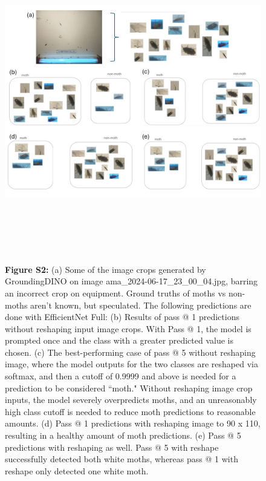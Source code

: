 \documentclass[twocolumn]{article}
\begin{document}
\begin{figure}[h]
    \includegraphics[width=16cm, height=14cm]{imgs/S_fig2.jpg}
    \captionsetup{width=0.9\textwidth}
    \caption*{\textbf{Figure S2:} (a) Some of the image crops generated by GroundingDINO on image 
    ama\_2024-06-17\_23\_00\_04.jpg, barring an incorrect crop on equipment. Ground
    truths of moths vs non-moths aren't known, but speculated. The following predictions are
    done with EfficientNet Full: (b) Results of pass @ 1 predictions
    without reshaping input image crops. With Pass @ 1,
    the model is prompted once and the class with a greater predicted value is chosen.
    (c) The best-performing case of pass @ 5 without reshaping image, where
    the model outputs for the two classes are reshaped via softmax, and then 
    a cutoff of 0.9999 and above is needed for a prediction to be considered 
    ``moth." Without reshaping image crop inputs, the model severely overpredicts moths, and 
    an unreasonably high class cutoff is needed to reduce moth predictions to reasonable amounts. 
    (d) Pass @ 1 predictions with reshaping image to 90 x 110, resulting in a healthy amount of moth
    predictions. (e) Pass @ 5 predictions with reshaping as well. Pass @ 5 with reshape successfully detected both white moths,
     whereas pass @ 1 with reshape only detected one white moth.}  
\end{figure} 
\end{document}
